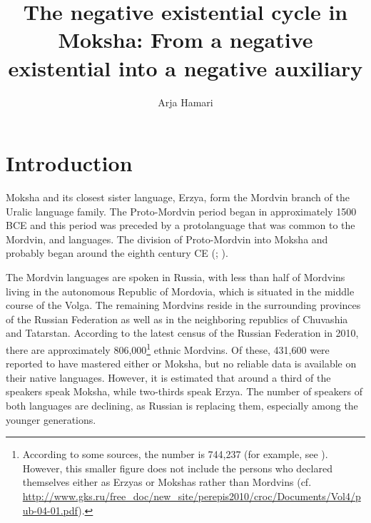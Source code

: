 \documentclass[output=paper]{langsci/langscibook}
\author{Arja Hamari\affiliation{University of Helsinki}}
\title{%
The negative existential cycle in Moksha: From a negative existential into a negative auxiliary}
\begin{document}
\section{Introduction}

Moksha and its closest sister language, Erzya, form the Mordvin branch of the Uralic language family. The Proto-Mordvin period began in approximately 1500 BCE and this period was preceded by a protolanguage that was common to the Mordvin,  and  languages. The division of Proto-Mordvin into Moksha and  probably began around the eighth century CE (\citealt[13--15]{Bartens1999}; \citealt[13–14]{Keresztes2011}).

  The Mordvin languages are spoken in Russia, with less than half of Mordvins living in the autonomous Republic of Mordovia, which is situated in the middle course of the Volga. The remaining Mordvins reside in the surrounding provinces of the Russian Federation as well as in the neighboring republics of Chuvashia and Tatarstan. According to the latest census of the Russian Federation in 2010, there are approximately 806,000\footnote{According to some sources, the number is 744,237 (for example, see \citealt{HamariAasmae2015}). However, this smaller figure does not include the persons who declared themselves either as Erzyas or Mokshas rather than Mordvins (cf. \href{http://www.gks.ru/free\_doc/new\_site/perepis2010/croc/Documents/Vol4/pub-04-01.pdf}{http://www.gks.ru/free\_doc/new\_site/perepis2010/croc/Documents/Vol4/pub-04-01.pdf}).} ethnic Mordvins. Of these, 431,600 were reported to have mastered either  or Moksha, but no reliable data is available on their native languages. However, it is estimated that around a third of the speakers speak Moksha, while two-thirds speak Erzya. The number of speakers of both languages are declining, as Russian is replacing them, especially among the younger generations.
\end{document}
